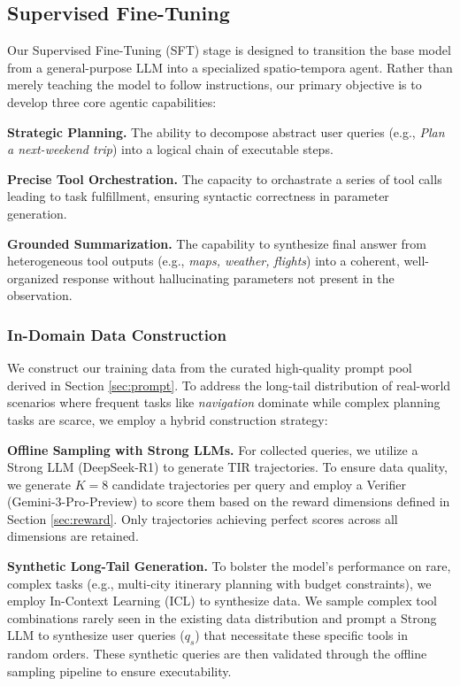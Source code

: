 \documentclass{article} %
\begin{document}
\subsection{Supervised Fine-Tuning} \label{sec:sft}

Our Supervised Fine-Tuning (SFT) stage is designed to transition the base model from a general-purpose LLM into a specialized spatio-tempora agent. Rather than merely teaching the model to follow instructions, our primary objective is to develop three core agentic capabilities:

\textbf{Strategic Planning.} The ability to decompose abstract user queries (e.g., \textit{Plan a next-weekend trip}) into a logical chain of executable steps.

\textbf{Precise Tool Orchestration.} The capacity to orchastrate a series of tool calls leading to task fulfillment, ensuring syntactic correctness in parameter generation.

\textbf{Grounded Summarization.} The capability to synthesize final answer from heterogeneous tool outputs (e.g., \textit{maps, weather, flights}) into a coherent, well-organized response without hallucinating parameters not present in the observation.

\subsubsection{In-Domain Data Construction}

We construct our training data from the curated high-quality prompt pool derived in Section \ref{sec:prompt}. To address the long-tail distribution of real-world scenarios where frequent tasks like \textit{navigation} dominate while complex planning tasks are scarce, we employ a hybrid construction strategy:

\textbf{Offline Sampling with Strong LLMs.} For collected queries, we utilize a Strong LLM (DeepSeek-R1) to generate TIR trajectories. To ensure data quality, we generate $K=8$ candidate trajectories per query and employ a Verifier (Gemini-3-Pro-Preview) to score them based on the reward dimensions defined in Section \ref{sec:reward}. Only trajectories achieving perfect scores across all dimensions are retained.

\textbf{Synthetic Long-Tail Generation.} To bolster the model's performance on rare, complex tasks (e.g., multi-city itinerary planning with budget constraints), we employ In-Context Learning (ICL) to synthesize data. We sample complex tool combinations rarely seen in the existing data distribution and prompt a Strong LLM to synthesize user queries ($q_s$) that necessitate these specific tools in random orders. These synthetic queries are then validated through the offline sampling pipeline to ensure executability.
\end{document}
